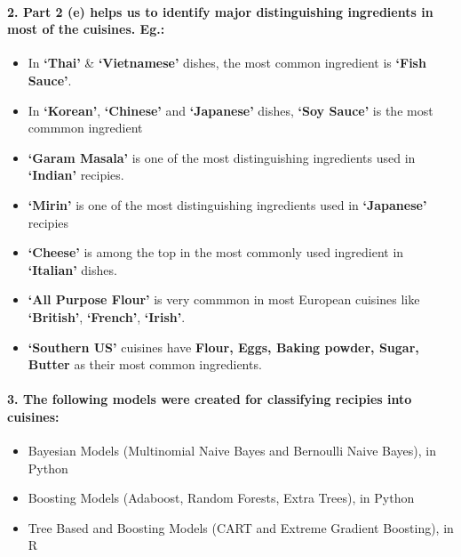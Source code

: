 \documentclass{article}
\begin{document}
\paragraph{2. Part 2 (e) helps us to identify major distinguishing
ingredients in most of the cuisines.
Eg.:}\label{part-2-e-helps-us-to-identify-major-distinguishing-ingredients-in-most-of-the-cuisines.-eg.}

\begin{itemize}
\tightlist
\item
  In \textbf{`Thai'} \& \textbf{`Vietnamese'} dishes, the most common
  ingredient is \textbf{`Fish Sauce'}.
\item
  In \textbf{`Korean'}, \textbf{`Chinese'} and \textbf{`Japanese'}
  dishes, \textbf{`Soy Sauce'} is the most commmon ingredient
\item
  \textbf{`Garam Masala'} is one of the most distinguishing ingredients
  used in \textbf{`Indian'} recipies.
\item
  \textbf{`Mirin'} is one of the most distinguishing ingredients used in
  \textbf{`Japanese'} recipies
\item
  \textbf{`Cheese'} is among the top in the most commonly used
  ingredient in \textbf{`Italian'} dishes.
\item
  \textbf{`All Purpose Flour'} is very commmon in most European cuisines
  like \textbf{`British'}, \textbf{`French'}, \textbf{`Irish'}.
\item
  \textbf{`Southern US'} cuisines have \textbf{Flour, Eggs, Baking
  powder, Sugar, Butter} as their most common ingredients.
\end{itemize}

\paragraph{3. The following models were created for classifying recipies
into
cuisines:}\label{the-following-models-were-created-for-classifying-recipies-into-cuisines}

\begin{itemize}
\tightlist
\item
  Bayesian Models (Multinomial Naive Bayes and Bernoulli Naive Bayes),
  in Python
\item
  Boosting Models (Adaboost, Random Forests, Extra Trees), in Python
\item
  Tree Based and Boosting Models (CART and Extreme Gradient Boosting),
  in R
\end{itemize}
\end{document}
